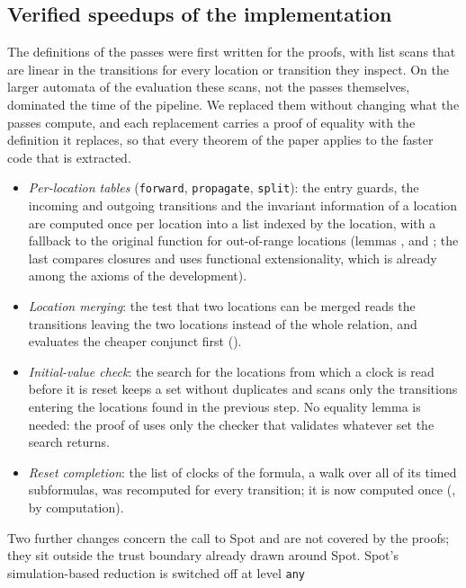 \subsection{Verified speedups of the implementation}
\label{sec:speedups-detail}
The definitions of the passes were first written for the proofs, with list
scans that are linear in the transitions for every location or transition
they inspect. On the larger automata of the evaluation these scans, not the
passes themselves, dominated the time of the pipeline. We replaced them
without changing what the passes compute, and each replacement carries a
proof of equality with the definition it replaces, so that every theorem of
the paper applies to the faster code that is extracted.
\begin{itemize}[leftmargin=*]
  \item \emph{Per-location tables} (\texttt{forward}, \texttt{propagate},
    \texttt{split}): the entry guards, the incoming and outgoing transitions and the
    invariant information of a location are computed once per location into a list
    indexed by the location, with a fallback to the original function for
    out-of-range locations (lemmas ,  and
    ; the last compares closures and uses functional extensionality,
    which is already among the axioms of the development).
  \item \emph{Location merging}: the test that two locations can be merged reads the
    transitions leaving the two locations instead of the whole relation, and
    evaluates the cheaper conjunct first ().
  \item \emph{Initial-value check}: the search for the locations from which a clock
    is read before it is reset keeps a set without duplicates and scans only the
    transitions entering the locations found in the previous step. No equality
    lemma is needed: the proof of  uses only the checker that
    validates whatever set the search returns.
  \item \emph{Reset completion}: the list of clocks of the formula, a walk over all of its
    timed subformulas, was recomputed for every transition; it is now computed once
    (, by computation).
\end{itemize}
Two further changes concern the call to Spot and are not covered by the proofs;
they sit outside the trust boundary already drawn around Spot. Spot's
simulation-based reduction is switched off at level \texttt{any}
